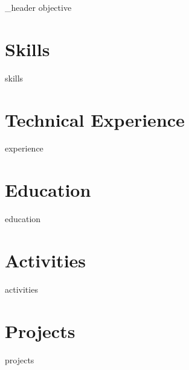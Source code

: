 \documentclass[letter,10pt]{article}
\author{Andrei Petrov}
\begin{document}
{_header}
{objective}

\section{Skills}
{skills}

\section{Technical Experience}
{experience}

\section{Education}
{education}


\section{Activities}
{activities}

\newpage
\section{Projects}
{projects}



\end{document}
